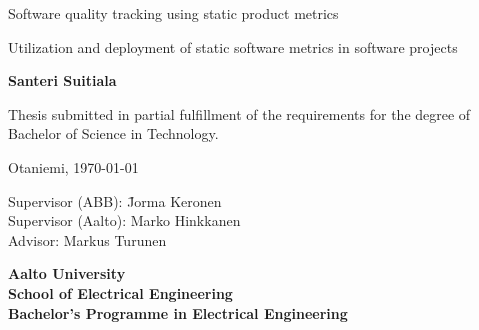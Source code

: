 {\parindent0pt %
\begin{spacing}{1.1}

 {\sffamily{}}
\end{spacing}

\vspace{12.7mm}

\begin{spacing}{1.63}
{\fontsize{17.8pt}{17.8pt}\selectfont Software quality tracking using static product metrics}
\end{spacing}

\vspace{10.5mm}

\begin{spacing}{1.2}
{\fontsize{13pt}{13pt}\selectfont Utilization and deployment of static software metrics in software projects}
\end{spacing}

\vspace{10.6mm}

{\fontsize{13.9pt}{13.9pt}\bfseries\sffamily\lsstyle Santeri Suitiala}

\vfill

{\fontsize{10.3pt}{10.3pt}\sffamily\lsstyle\raggedright
\begin{spacing}{1.06}

Thesis submitted in partial fulfillment of the requirements for the
degree of Bachelor of Science in Technology.

Otaniemi, \today

\begin{tabbing}
Supervisor (ABB):\hspace{6mm} \= Jorma Keronen \\
Supervisor (Aalto):\> Marko Hinkkanen \\
Advisor: \> Markus Turunen
\end{tabbing}
\vspace{-4mm}
\end{spacing}
} %

\vspace{11.5mm}

\begin{spacing}{.9}
{\bfseries\sffamily\lsstyle Aalto University \\
School of Electrical Engineering \\
Bachelor’s Programme in Electrical Engineering}
\end{spacing}
} %



